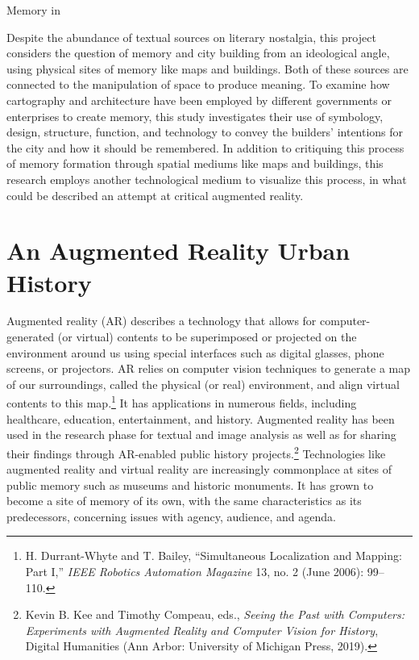 Memory in 

Despite the abundance of textual sources on literary nostalgia, this project considers the question of memory and city building from an ideological angle, using physical sites of memory like maps and buildings. Both of these sources are connected to the manipulation of space to produce meaning. To examine how cartography and architecture have been employed by different governments or enterprises to create memory, this study investigates their use of symbology, design, structure, function, and technology to convey the builders’ intentions for the city and how it should be remembered. In addition to critiquing this process of memory formation through spatial mediums like maps and buildings, this research employs another technological medium to visualize this process, in what could be described an attempt at critical augmented reality.

\section{An Augmented Reality Urban History}
Augmented reality (AR) describes a technology that allows for computer-generated (or virtual) contents to be superimposed or projected on the environment around us using special interfaces such as digital glasses, phone screens, or projectors. AR relies on computer vision techniques to generate a map of our surroundings, called the physical (or real) environment, and align virtual contents to this map.\footnote{H. Durrant-Whyte and T. Bailey, “Simultaneous Localization and Mapping: Part I,” \textit{IEEE Robotics Automation Magazine} 13, no. 2 (June 2006): 99–110.} It has applications in numerous fields, including healthcare, education, entertainment, and history. Augmented reality has been used in the research phase for textual and image analysis as well as for sharing their findings through AR-enabled public history projects.\footnote{Kevin B. Kee and Timothy Compeau, eds., \textit{Seeing the Past with Computers: Experiments with Augmented Reality and Computer Vision for History}, Digital Humanities (Ann Arbor: University of Michigan Press, 2019).} Technologies like augmented reality and virtual reality are increasingly commonplace at sites of public memory such as museums and historic monuments. It has grown to become a site of memory of its own, with the same characteristics as its predecessors, concerning issues with agency, audience, and agenda.

